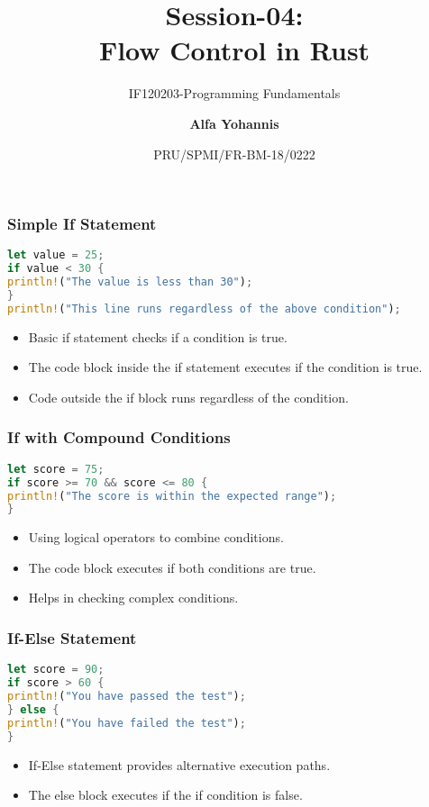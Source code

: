 \documentclass[aspectratio=169, table]{beamer}
\subtitle{IF120203-Programming Fundamentals}
\title{Session-04:\\\LARGE{Flow Control in Rust}\\ \vspace{10pt}}
\date[Serial]{\scriptsize {PRU/SPMI/FR-BM-18/0222}}
\author[Pradita]{\small{\textbf{Alfa Yohannis}}}
\begin{document}
\frame{\titlepage}

\begin{frame}[fragile]
\frametitle{Simple If Statement}
\begin{lstlisting}[language=Rust]
let value = 25;
if value < 30 {
println!("The value is less than 30");
}
println!("This line runs regardless of the above condition");
\end{lstlisting}
\begin{itemize}
\item Basic if statement checks if a condition is true.
\item The code block inside the if statement executes if the condition is true.
\item Code outside the if block runs regardless of the condition.
\end{itemize}
\end{frame}

\begin{frame}[fragile]
\frametitle{If with Compound Conditions}
\begin{lstlisting}[language=Rust]
let score = 75;
if score >= 70 && score <= 80 {
println!("The score is within the expected range");
}
\end{lstlisting}
\begin{itemize}
\item Using logical operators to combine conditions.
\item The code block executes if both conditions are true.
\item Helps in checking complex conditions.
\end{itemize}
\end{frame}

\begin{frame}[fragile]
\frametitle{If-Else Statement}
\begin{lstlisting}[language=Rust]
let score = 90;
if score > 60 {
println!("You have passed the test");
} else {
println!("You have failed the test");
}
\end{lstlisting}
\begin{itemize}
\item If-Else statement provides alternative execution paths.
\item The else block executes if the if condition is false.
\end{itemize}
\end{frame}
\end{document}
